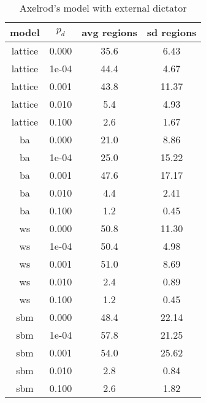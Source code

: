 
\begin{table}[htbp] 
\centering
\caption{Axelrod's model with external dictator} 
\begin{tabular}{cccc}
model & $p_d$ & avg regions & sd regions \\ 
\midrule
lattice & 0.000 & 35.6 & 6.43\\
lattice & 1e-04 & 44.4 & 4.67\\
lattice & 0.001 & 43.8 & 11.37\\
lattice & 0.010 & 5.4 & 4.93\\
lattice & 0.100 & 2.6 & 1.67\\
ba & 0.000 & 21.0 & 8.86\\
ba & 1e-04 & 25.0 & 15.22\\
ba & 0.001 & 47.6 & 17.17\\
ba & 0.010 & 4.4 & 2.41\\
ba & 0.100 & 1.2 & 0.45\\
ws & 0.000 & 50.8 & 11.30\\
ws & 1e-04 & 50.4 & 4.98\\
ws & 0.001 & 51.0 & 8.69\\
ws & 0.010 & 2.4 & 0.89\\
ws & 0.100 & 1.2 & 0.45\\
sbm & 0.000 & 48.4 & 22.14\\
sbm & 1e-04 & 57.8 & 21.25\\
sbm & 0.001 & 54.0 & 25.62\\
sbm & 0.010 & 2.8 & 0.84\\
sbm & 0.100 & 2.6 & 1.82\\
\bottomrule
\end{tabular}

\label{tab:dictator}

\end{table}

